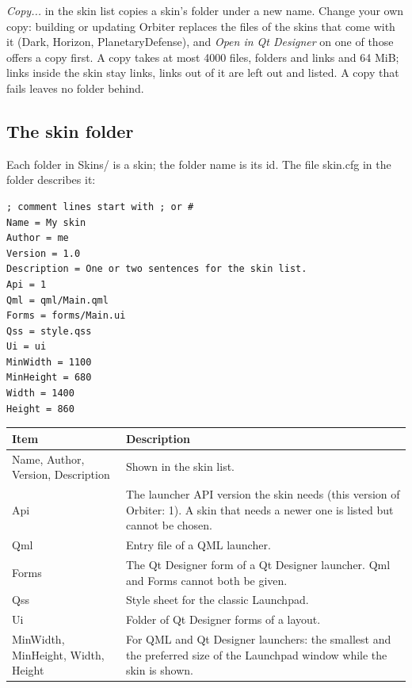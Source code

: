 \documentclass[Orbiter Developer Manual.tex]{subfiles}
\begin{document}
\begin{sloppypar}
\noindent
\textit{Copy...} in the skin list copies a skin's folder under a new name. Change your own copy: building or updating Orbiter replaces the files of the skins that come with it (Dark, Horizon, PlanetaryDefense), and \textit{Open in Qt Designer} on one of those offers a copy first. A copy takes at most 4000 files, folders and links and 64 MiB; links inside the skin stay links, links out of it are left out and listed. A copy that fails leaves no folder behind.


\subsection{The skin folder}
Each folder in Skins/ is a skin; the folder name is its id. The file skin.cfg in the folder describes it:

\begin{lstlisting}[language=OSFS]
; comment lines start with ; or #
Name = My skin
Author = me
Version = 1.0
Description = One or two sentences for the skin list.
Api = 1
Qml = qml/Main.qml
Forms = forms/Main.ui
Qss = style.qss
Ui = ui
MinWidth = 1100
MinHeight = 680
Width = 1400
Height = 860
\end{lstlisting}

	\begin{longtable}{ |p{}|p{}| }
	\hline\rule{0pt}{2ex}
	\textbf{Item} & \textbf{Description}\\
	\hline\rule{0pt}{2ex}
	Name, Author, Version, Description & Shown in the skin list.\\
	\hline\rule{0pt}{2ex}
	Api & The launcher API version the skin needs (this version of Orbiter: 1). A skin that needs a newer one is listed but cannot be chosen.\\
	\hline\rule{0pt}{2ex}
	Qml & Entry file of a QML launcher.\\
	\hline\rule{0pt}{2ex}
	Forms & The Qt Designer form of a Qt Designer launcher. Qml and Forms cannot both be given.\\
	\hline\rule{0pt}{2ex}
	Qss & Style sheet for the classic Launchpad.\\
	\hline\rule{0pt}{2ex}
	Ui & Folder of Qt Designer forms of a layout.\\
	\hline\rule{0pt}{2ex}
	MinWidth, MinHeight, Width, Height & For QML and Qt Designer launchers: the smallest and the preferred size of the Launchpad window while the skin is shown.\\
	\hline
	\end{longtable}


\end{sloppypar}
\end{document}
